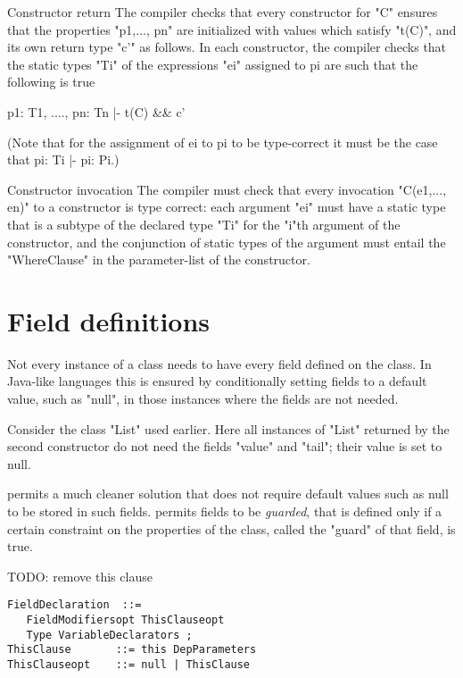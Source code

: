 \begin{staticrule}{Constructor return}
   The compiler checks that every constructor for \xcd"C" ensures that
   the properties \xcd"p1,..., pn" are initialized with values which satisfy
   \xcd"t(C)", and its own return type \xcd"c'" as follows.  In each constructor, the
   compiler checks that the static types \xcd"Ti" of the expressions \xcd"ei"
   assigned to pi are such that the following is true
\begin{xten}
p1: T1, ...., pn: Tn |- t(C) && c'     
\end{xten}
\end{staticrule}
(Note that for the assignment of ei to pi to be type-correct it must be the
    case that pi: Ti |- pi: Pi.) 


\begin{staticrule}{Constructor invocation}
The compiler must check that every invocation \xcd"C(e1,..., en)" to a
constructor is type correct: each argument \xcd"ei" must have a static type
that is a subtype of the declared type \xcd"Ti" for the \xcd"i"th argument of the
constructor, and the conjunction of static types of the argument must
entail the \xcd"WhereClause" in the parameter-list of the constructor.
\end{staticrule}

\section{Field definitions}

Not every instance of a class needs to have every field defined on the
class. In Java-like languages this is ensured by conditionally setting
fields to a default value, such as \xcd"null", in those instances where the
fields are not needed.  

Consider the class \xcd"List" used earlier.  Here all instances of \xcd"List"
returned by the second constructor do not need the fields \xcd"value" and
\xcd"tail"; their value is set to null.

\Xten{} permits a much cleaner solution that does not require default
values such as null to be stored in such fields. \Xten{} permits fields to
be {\em guarded}, that is defined only if a certain constraint on the
properties of the class, called the \xcd"guard" of that field, is true.

TODO: remove this clause

\begin{verbatim}
FieldDeclaration  ::= 
   FieldModifiersopt ThisClauseopt 
   Type VariableDeclarators ;
ThisClause       ::= this DepParameters
ThisClauseopt    ::= null | ThisClause
\end{verbatim}

